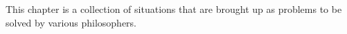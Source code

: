 This chapter is a collection of situations that are brought up as problems to be solved by various philosophers.
